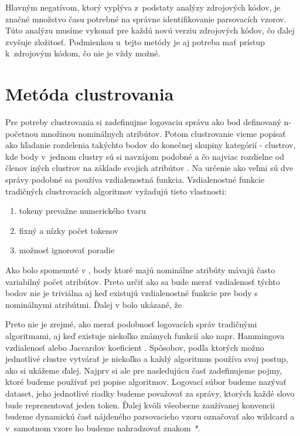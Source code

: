 Hlavným negatívom, ktorý vyplýva z~podstaty analýzy zdrojových kódov, je značné množstvo času potrebné na správne identifikovanie parsovacích vzorov. Túto analýzu musíme vykonať pre každú novú verziu zdrojových kódov, čo ďalej zvyšuje zložitosť. Podmienkou u~tejto metódy je aj potreba mať prístup k~zdrojovým kódom, čo nie je vždy možné. 

\section{ Metóda clustrovania}
Pre potreby clustrovania si zadefinujme logovaciu správu ako bod definovaný n-početnou množinou nominálnych atribútov. Potom clustrovanie vieme popísať ako hľadanie rozdelenia takýchto bodov do konečnej skupiny kategórií - clustrov, kde body v~jednom clustry sú si navzájom podobné a čo najviac rozdielne od členov iných clustrov na základe svojich atribútov \parencite{iplom}. Na určenie ako veľmi sú dve správy podobné sa používa vzdialenostná funkcia. Vzdialenostné funkcie tradičných clustrovacích algoritmov vyžadujú tieto vlastnosti:

\begin{enumerate}
  \item tokeny prevažne numerického tvaru
  \item fixný a nízky počet tokenov
  \item možnosť ignorovať poradie
\end{enumerate}

Ako bolo spomenuté v \parencite{logcluster}, body ktoré majú nominálne atribúty mávajú často variabilný počet atribútov. Preto určiť ako sa bude merať vzdialenosť týchto bodov nie je triviálna aj keď existujú vzdialenostné funkcie pre body s nominálnymi atribútmi. Ďalej v \parencite{logcluster} bolo ukázané, že 

Preto nie je zrejmé, ako merať podobnosť logovacích správ tradičnými algoritmami, aj keď existuje niekoľko známych funkcií ako napr. Hammingova vzdialenosť alebo Jaccardov koeficient \parencite{slct}. Spôsobov, podľa ktorých možno jednotlivé clustre vytvárať je niekoľko a každý algoritmus používa svoj postup, ako si ukážeme ďalej. Najprv si ale pre nasledujúcu časť zadefinujeme pojmy, ktoré budeme používať pri popise algoritmov. Logovací súbor budeme nazývať dataset, jeho jednotlivé riadky budeme považovať za správy, ktorých každé slovo bude reprezentovať jeden token. Ďalej kvôli všeobecne zaužívanej konvencii budeme dynamickú časť nájdeného parsovacieho vzoru označovať ako wildcard a v~samotnom vzore ho budeme nahradzovať znakom \emph{*}.

